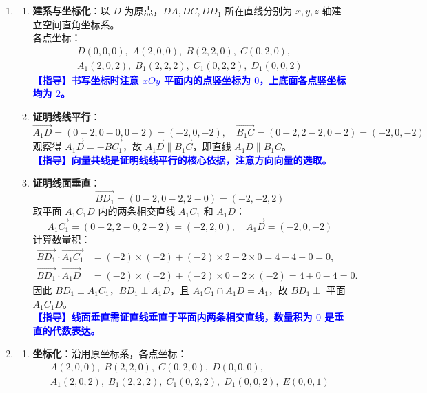 \documentclass{article}
\newcommand{\comment}[1]{\textcolor{blue}{\small\textbf{【指导】#1}}}
\begin{document}
	
	\begin{enumerate}[label=\textbf{(\arabic*)},leftmargin=*]
	\item
	\begin{enumerate}[label=\textbf{\arabic*.},leftmargin=*]
		\item \textbf{建系与坐标化}：以 $D$ 为原点，$DA, DC, DD_1$ 所在直线分别为 $x, y, z$ 轴建立空间直角坐标系。\\
		各点坐标：
		\[
		\begin{array}{c}
			D(0,0,0),\; A(2,0,0),\; B(2,2,0),\; C(0,2,0),\\
			A_1(2,0,2),\; B_1(2,2,2),\; C_1(0,2,2),\; D_1(0,0,2)
		\end{array}
		\]
		\comment{书写坐标时注意 $xOy$ 平面内的点竖坐标为 $0$，上底面各点竖坐标均为 $2$。}
		
		\item \textbf{证明线线平行}：
		\[
		\overrightarrow{A_1D} = (0-2,0-0,0-2)=(-2,0,-2),\quad 
		\overrightarrow{B_1C} = (0-2,2-2,0-2)=(-2,0,-2)
		\]
		观察得 $\overrightarrow{A_1D} = -\overrightarrow{BC_1}$，故 $\overrightarrow{A_1D} \parallel \overrightarrow{B_1C}$，即直线 $A_1D \parallel B_1C$。\\
		\comment{向量共线是证明线线平行的核心依据，注意方向向量的选取。}
		
		\item \textbf{证明线面垂直}：
		\[
		\overrightarrow{BD_1} = (0-2,0-2,2-0)=(-2,-2,2)
		\]
		取平面 $A_1C_1D$ 内的两条相交直线 $A_1C_1$ 和 $A_1D$：
		\[
		\overrightarrow{A_1C_1} = (0-2,2-0,2-2)=(-2,2,0),\quad 
		\overrightarrow{A_1D} = (-2,0,-2)
		\]
		计算数量积：
		\[
		\begin{aligned}
			\overrightarrow{BD_1} \cdot \overrightarrow{A_1C_1} &= (-2)\times(-2)+(-2)\times2+2\times0 = 4-4+0=0,\\
			\overrightarrow{BD_1} \cdot \overrightarrow{A_1D} &= (-2)\times(-2)+(-2)\times0+2\times(-2) = 4+0-4=0.
		\end{aligned}
		\]
		因此 $BD_1 \perp A_1C_1$，$BD_1 \perp A_1D$，且 $A_1C_1 \cap A_1D = A_1$，故 $BD_1 \perp$ 平面 $A_1C_1D$。\\
		\comment{线面垂直需证直线垂直于平面内两条相交直线，数量积为 $0$ 是垂直的代数表达。}
	\end{enumerate}
	
	
	\item
	\begin{enumerate}[label=\textbf{\arabic*.},leftmargin=*]
		\item \textbf{坐标化}：沿用原坐标系，各点坐标：
		\[
		\begin{array}{c}
			A(2,0,0),\; B(2,2,0),\; C(0,2,0),\; D(0,0,0),\\
			A_1(2,0,2),\; B_1(2,2,2),\; C_1(0,2,2),\; D_1(0,0,2),\; E(0,0,1)
		\end{array}
		\]
		

\end{enumerate}
\end{enumerate}
\end{document}
